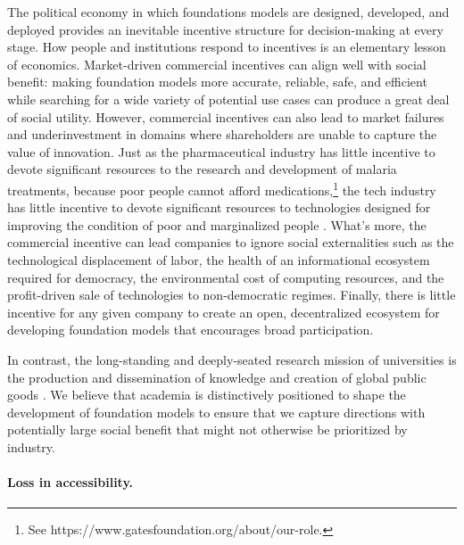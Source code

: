 The political economy in which foundations models are designed, developed, and deployed provides an inevitable incentive structure for decision-making at every stage. How people and institutions respond to incentives is an elementary lesson of economics.
Market-driven commercial incentives can align well with social benefit:
making foundation models more accurate, reliable, safe, and efficient while searching for a wide variety of potential use cases
can produce a great deal of social utility.
However, commercial incentives can also lead to market failures and underinvestment in domains where shareholders are unable to capture the value of innovation. 
Just as the pharmaceutical industry has little incentive to devote significant resources to the research and development of malaria treatments, because poor people cannot afford medications,\footnote{See https://www.gatesfoundation.org/about/our-role.} the tech industry has little incentive to devote significant resources to technologies designed for improving the condition of poor and marginalized people \citep{reich2021system}. What's more, the commercial incentive can lead companies to ignore social externalities \citep{acemoglu2021redesigning, reich2021system} such as the technological displacement of labor, the health of an informational ecosystem required for democracy, the environmental cost of computing resources, and the profit-driven sale of technologies to non-democratic regimes.
Finally, there is little incentive for any given company to create
an open, decentralized ecosystem for developing foundation models
that encourages broad participation.

In contrast,
the long-standing and deeply-seated research mission of universities is the
production and dissemination of knowledge and creation of global public goods \citep{kerr2001university,rhoten2011knowledge,nussbaum2010not}. 
We believe that academia is distinctively positioned to
shape the development of foundation models to ensure that we capture
directions with potentially large social benefit that might not otherwise be prioritized by industry.

\paragraph{Loss in accessibility.}

